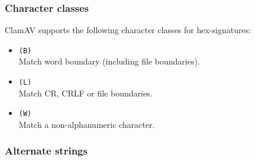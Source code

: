 \documentclass[a4paper,titlepage,12pt]{article}
\begin{document}
    \subsubsection{Character classes}
    ClamAV supports the following character classes for hex-signatures:
    \begin{itemize}
	\item \verb+(B)+\\
	Match word boundary (including file boundaries).
	\item \verb+(L)+\\
	Match CR, CRLF or file boundaries.
	\item \verb+(W)+\\
	Match a non-alphanumeric character.
    \end{itemize}

    \subsubsection{Alternate strings}
\end{document}
